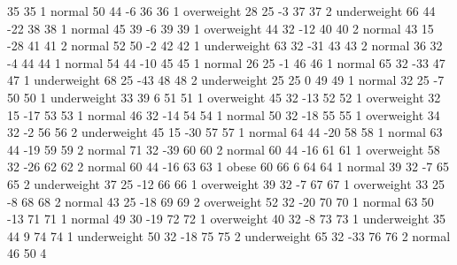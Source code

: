 \begin{Schunk}
\begin{Soutput}
		35           35   1      normal  50         44           -6
		36           36   1  overweight  28         25           -3
		37           37   2 underweight  66         44          -22
		38           38   1      normal  45         39           -6
		39           39   1  overweight  44         32          -12
		40           40   2      normal  43         15          -28
		41           41   2      normal  52         50           -2
		42           42   1 underweight  63         32          -31
		43           43   2      normal  36         32           -4
		44           44   1      normal  54         44          -10
		45           45   1      normal  26         25           -1
		46           46   1      normal  65         32          -33
		47           47   1 underweight  68         25          -43
		48           48   2 underweight  25         25            0
		49           49   1      normal  32         25           -7
		50           50   1 underweight  33         39            6
		51           51   1  overweight  45         32          -13
		52           52   1  overweight  32         15          -17
		53           53   1      normal  46         32          -14
		54           54   1      normal  50         32          -18
		55           55   1  overweight  34         32           -2
		56           56   2 underweight  45         15          -30
		57           57   1      normal  64         44          -20
		58           58   1      normal  63         44          -19
		59           59   2      normal  71         32          -39
		60           60   2      normal  60         44          -16
		61           61   1  overweight  58         32          -26
		62           62   2      normal  60         44          -16
		63           63   1       obese  60         66            6
		64           64   1      normal  39         32           -7
		65           65   2 underweight  37         25          -12
		66           66   1  overweight  39         32           -7
		67           67   1  overweight  33         25           -8
		68           68   2      normal  43         25          -18
		69           69   2  overweight  52         32          -20
		70           70   1      normal  63         50          -13
		71           71   1      normal  49         30          -19
		72           72   1  overweight  40         32           -8
		73           73   1 underweight  35         44            9
		74           74   1 underweight  50         32          -18
		75           75   2 underweight  65         32          -33
		76           76   2      normal  46         50            4

\end{Soutput}
\end{Schunk}
